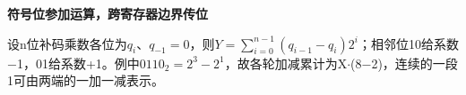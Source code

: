 {\color{ink}\bfseries 符号位参加运算，跨寄存器边界传位}\par\vspace{1bp}设n位补码乘数各位为\(q_{i}\)、\(q_{-1}=\allowbreak{}0\)，则\(Y=\allowbreak{}\sum _{i=\allowbreak{}0}^{n-1}(q_{i-1}-q_{i})2^{i}\)；相邻位10给系数\(-\)1，01给系数+\allowbreak{}1。例中\(0110_{2}=\allowbreak{}2^{3}-2^{1}\)，故各轮加减累计为X\(\cdot \)(8\(-\)2)，连续的一段1可由两端的一加一减表示。
